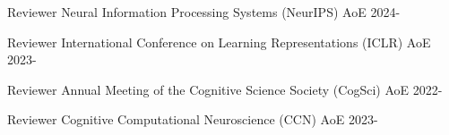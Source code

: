 
\begin{cvhonors}

   \cvhonor
    {Reviewer} %
    {Neural Information Processing Systems (NeurIPS)} %
    {AoE} %
    {2024-} %
    
  \cvhonor
    {Reviewer} %
    {International Conference on Learning Representations (ICLR)} %
    {AoE} %
    {2023-} %

\cvhonor
    {Reviewer} %
    {Annual Meeting of the Cognitive Science Society (CogSci)} %
    {AoE} %
    {2022-} %

    \cvhonor
    {Reviewer} %
    {Cognitive Computational Neuroscience (CCN)} %
    {AoE} %
    {2023-} %
    
    \\
    
\end{cvhonors}

    
    
